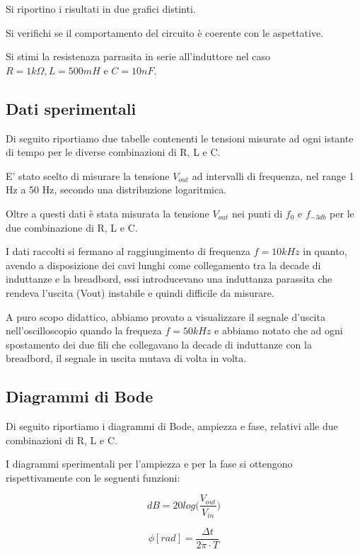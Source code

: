 \documentclass{article}
\begin{document}
Si riportino i risultati in due grafici distinti.

Si verifichi se il comportamento del circuito è coerente con le aspettative.

Si stimi la resistenaza parrasita in serie all'induttore nel caso $R = 1 k\Omega, L = 500 mH$ e $C = 10 nF$.

\subsection{Dati sperimentali}
Di seguito riportiamo due tabelle contenenti le tensioni misurate ad ogni istante di tempo per le diverse combinazioni di R, L e C.



E' stato scelto di misurare la tensione \textit{$V_{out}$} ad intervalli di frequenza, nel range 1 Hz a 50 Hz, secondo una distribuzione logaritmica.

Oltre a questi dati è stata misurata la tensione \textit{$V_{out}$} nei punti di $f_0$ e $f_{-3db}$ per le due combinazione di R, L e C. 

I dati raccolti si fermano al raggiungimento di frequenza $f = 10 kHz$ in quanto, avendo a disposizione dei cavi lunghi come collegamento tra la decade di induttanze e la breadbord, essi introducevano una induttanza parassita che rendeva l'uscita (Vout) instabile e quindi difficile da misurare.

A puro scopo didattico, abbiamo provato a visualizzare il segnale d'uscita nell'oscilloscopio quando la frequeza $f = 50 kHz$ e abbiamo notato che ad ogni spostamento dei due fili che collegavano la decade di induttanze con la breadbord, il segnale in uscita mutava di volta in volta.

\subsection{Diagrammi di Bode}
Di seguito riportiamo i diagrammi di Bode, ampiezza e fase, relativi alle due combinazioni di R, L e C.

\noindent
I diagrammi sperimentali per l’ampiezza e per la fase si ottengono rispettivamente con le seguenti funzioni:

\begin{minipage} [t]{0.45\textwidth}
    \begin{equation}
        dB = 20log \bigg ( \frac{V_{out}}{V_{in}} \bigg)
    \end{equation}
\end{minipage}
\hfill
 \begin{minipage} [t]{0.45\textwidth}
    \begin{equation}
        \phi[rad] = \frac{\Delta t}{2 \pi \cdot T} 
    \end{equation}
\end{minipage}
\end{document}
